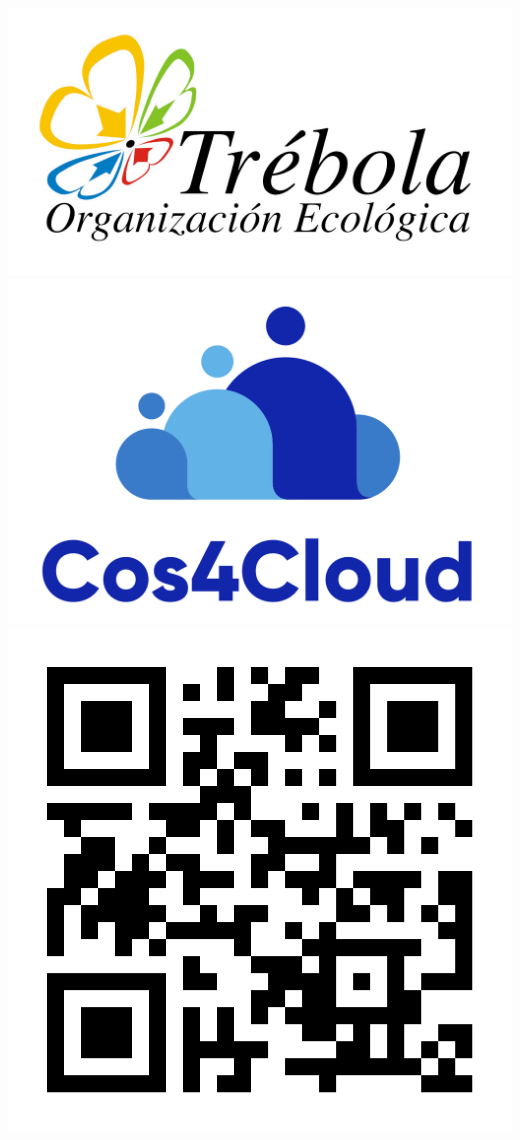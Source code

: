 \documentclass[a0paper,portrait]{baposter}
\begin{document}
\begin{poster}
{  {
    {
        \hspace{0.2cm}
        \centering
      \includegraphics[scale=.65]{images/trebola-logo-01.jpg}
    }
    {
        \hspace{-0.5cm}
        \centering
      \includegraphics[scale=.14]{images/cos4Cloud_logo-02.png}
    }
    {
        \hspace{-0.5cm}
        \centering
      \includegraphics[scale=.150]{images/https_canairio.png}
    }
  }

}
\end{poster}
\end{document}
